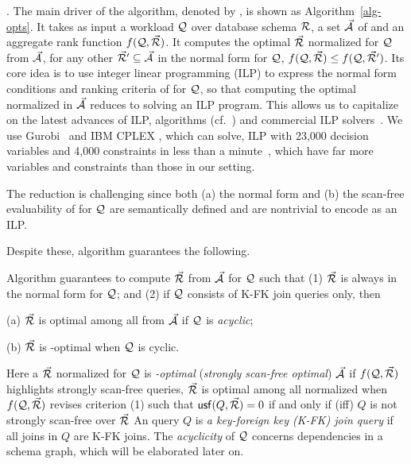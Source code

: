 .
The main driver of the algorithm, denoted by \opts,
is shown as
Algorithm~\ref{alg-opts}. It takes as input a workload $\mathcal Q$ over
database schema ${\mathcal R}$, a set $\vec{{\mathcal A}}$ of \bss and an aggregate rank
function $f(\mathcal Q,\allowbreak \vec{{\mathcal R}})$.
It computes the optimal \bds $\vec{{\mathcal R}}$ normalized for $\mathcal Q$ from $\vec{{\mathcal A}}$,
\ie for any other \bds $\vec{{\mathcal R}}'\allowbreak \subseteq \allowbreak \vec{{\mathcal A}}$ in the
normal form for $\mathcal Q$, $f(\mathcal Q,\allowbreak \vec{{\mathcal R}})\allowbreak \leq\allowbreak f(\mathcal Q,\allowbreak \vec{{\mathcal R}}')$.
%
Its core idea is to use integer linear programming (ILP) to
express the normal form conditions and ranking criteria of \bdss
for $\mathcal Q$, so that computing the optimal normalized \bds in $\vec{{\mathcal A}}$
reduces to solving an ILP program. This allows us to 
capitalize on the latest advances of ILP, \eg algorithms
(cf.~\cite{ILPbook}) and commercial ILP
solvers~\cite{cplex,gurobi,XpressMP}. We use
Gurobi~\cite{gurobi} and IBM CPLEX \cite{cplex}, which can solve,
\eg ILP with 23,000 decision variables and 4,000  constraints
in less than a minute~\cite{ILPstat}, which have far more
variables and constraints than those in our setting.



The reduction
is challenging since both (a) the normal form and (b) the
scan-free evaluability of \bdss for $\mathcal Q$ are semantically defined
and are nontrivial to encode as  an ILP.

\vspace{1ex}
Despite these, algorithm \opts guarantees the following.

\vspace{-0.3ex}
\begin{theorem}\label{thm-opts}
Algorithm \opts guarantees to compute $\vec{{\mathcal R}}$ from $\vec{{\mathcal A}}$
for $\mathcal Q$ such that
(1) $\vec{{\mathcal R}}$ is always in the normal form for $\mathcal Q$; and
(2) if $\mathcal Q$ consists of K-FK join \SPC queries only, then
\bi
\item[(a)] $\vec{{\mathcal R}}$ is optimal among all \bdss from $\vec{{\mathcal A}}$
  if $\mathcal Q$ is {\em acyclic}; 
\item[(b)] $\vec{{\mathcal R}}$ is \ssf-optimal when $\mathcal Q$ is cyclic. 
\ei
\vspace{-3.5ex}
\end{theorem}

Here a \bds $\vec{{\mathcal R}}$ normalized for $\mathcal Q$ is {\em \ssf-optimal}
({\em strongly scan-free optimal}) \wrt $\vec{{\mathcal A}}$ if $f(\mathcal Q, \vec{{\mathcal R}})$
highlights strongly scan-free queries, \ie $\vec{{\mathcal R}}$ is optimal
among all normalized \bdss when $f(\mathcal Q, \vec{{\mathcal R}})$ revises
  criterion (1) such that ${\mathsf{usf}}(Q,\allowbreak \vec{{\mathcal R}}) \allowbreak = \allowbreak 0$ if
  and only if
  (iff) $Q$ is not strongly scan-free over $\vec{{\mathcal R}}$
An \SPC
query $Q$ is {\em a key-foreign key (K-FK) join query} if all joins in
$Q$ are K-FK joins.
The {\em acyclicity} of $\mathcal Q$ concerns dependencies
in a schema graph, which will be elaborated later on.

